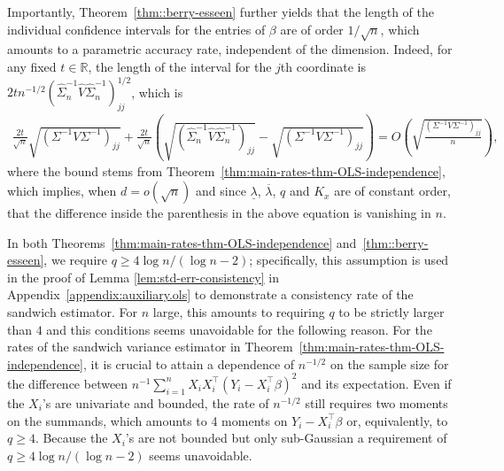 \documentclass[11pt]{article}
\begin{document}
Importantly,  Theorem~\ref{thm::berry-esseen} further yields that the length of the individual confidence intervals for the entries of $\beta$ are of order $1/\sqrt{n}$, which amounts to a parametric accuracy rate, independent of the dimension. Indeed, for any fixed $t \in \mathbb{R}$, the length of the interval for the $j$th coordinate is ${2tn^{-1/2}}(\widehat{\Sigma}_n^{-1}\widehat{V}\widehat{\Sigma}_n^{-1})_{jj}^{1/2}$, which is
\begin{align*}
\frac{2t}{\sqrt{n}} \sqrt{({\Sigma}^{-1}V{\Sigma}^{-1})_{jj}}
+ \frac{2t}{\sqrt{n}} \left( \sqrt{(\widehat{\Sigma}_n^{-1}\widehat{V}\widehat{\Sigma}_n^{-1})_{jj}} - \sqrt{({\Sigma}^{-1}V{\Sigma}^{-1})_{jj}}  \right) = O \left( \sqrt{\frac{({\Sigma}^{-1}V{\Sigma}^{-1})_{jj}}{n}} \right),
\end{align*}
where the bound stems from Theorem~\ref{thm:main-rates-thm-OLS-independence}, which  implies,  when $d = o(\sqrt{n})$ and since $\underline{\lambda}$, $\overline{\lambda}$, $q$ and $K_x$ are of constant order, that the difference inside the parenthesis in the above equation is vanishing in $n$.

In both Theorems~\ref{thm:main-rates-thm-OLS-independence} and~\ref{thm::berry-esseen}, we require $q \ge 4\log n/(\log n - 2)$; specifically, this assumption is used in the proof of Lemma \ref{lem:std-err-consistency} in Appendix~\ref{appendix:auxiliary.ols} to demonstrate a consistency rate of the sandwich estimator. For $n$ large, this amounts to requiring $q$ to be strictly larger than $4$ and this conditions seems unavoidable for the following reason. For the rates of the sandwich variance estimator in Theorem~\ref{thm:main-rates-thm-OLS-independence}, it is crucial to attain a dependence of $n^{-1/2}$ on the sample size for the difference between $n^{-1}\sum_{i=1}^n X_iX_i^{\top}(Y_i - X_i^{\top}\beta)^2$ and its expectation. Even if the $X_i$'s are univariate and bounded, the rate of $n^{-1/2}$ still requires two moments on the summands, which amounts to 4 moments on $Y_i - X_i^{\top}\beta$ or, equivalently, to $q \ge 4$. Because the $X_i$'s are not bounded but only sub-Gaussian a requirement of $q \ge 4\log n/(\log n - 2)$ seems unavoidable.
\end{document}
